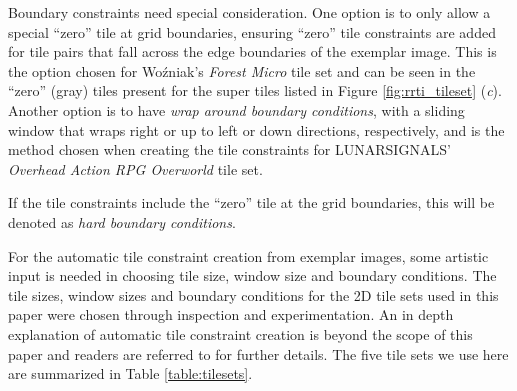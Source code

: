 Boundary constraints need special consideration.
One option is to only allow a special ``zero'' tile at grid boundaries, ensuring ``zero'' tile constraints are added
for tile pairs that fall across the edge boundaries of the exemplar image.
This is the option chosen for Wo\'zniak's \textit{Forest Micro} tile set and can be seen in the ``zero'' (gray) tiles present for
the super tiles listed in Figure \ref{fig:rrti_tileset} (\textit{c}).
Another option is to have \textit{wrap around boundary conditions}, with a sliding window that wraps right or up to left or down directions, respectively,
and is the method chosen when creating the tile constraints for LUNARSIGNALS' \textit{Overhead Action RPG Overworld} tile set.

If the tile constraints include the ``zero'' tile at the grid boundaries, this will be denoted as \textit{hard boundary conditions}.


For the automatic tile constraint creation from exemplar images, some artistic input is needed in choosing tile size, window size and boundary conditions.
The tile sizes, window sizes and boundary conditions for the 2D tile sets used in this paper were chosen through inspection and experimentation.
An in depth explanation of automatic tile constraint creation is beyond the scope of this paper and readers are referred to \cite{Gumin_2016, Sherratt_2019, BorisTheBrave_wfc_2021} for further details.
The five tile sets we use here are summarized in Table \ref{table:tilesets}.


